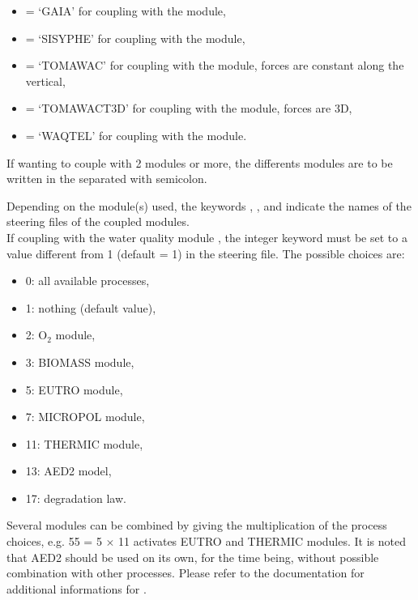 \begin{itemize}
\item  {}= `GAIA' for coupling with the \gaia module,

\item  {}= `SISYPHE' for coupling with the \sisyphe module,

\item  {}= `TOMAWAC' for coupling with the \tomawac module,
forces are constant along the vertical,

\item  {}= `TOMAWACT3D' for coupling with the \tomawac module,
forces are 3D,

\item  {}= `WAQTEL' for coupling with the \waqtel module.

\end{itemize}

If wanting to couple with 2 modules or more, the differents modules are to
be written in the  separated with semicolon.

Depending on the module(s) used, the keywords
, ,
 and 
indicate the names of the steering files
of the coupled modules.\\

If coupling with the water quality module \waqtel, the integer keyword
 must be set to a value different from 1 (default = 1)
in the  steering file.
The possible choices are:
\begin{itemize}
\item 0: all available processes,
\item 1: nothing (default value),
\item 2: O$_2$ module,
\item 3: BIOMASS module,
\item 5: EUTRO module,
\item 7: MICROPOL module,
\item 11: THERMIC module,
\item 13: AED2 model,
\item 17: degradation law.
\end{itemize}

Several modules can be combined by giving the multiplication of the process choices,
e.g. 55 = 5 $\times$ 11 activates EUTRO and THERMIC modules.
It is noted that AED2 should be used on its own, for the time being,
without possible combination with other processes.
Please refer to the \waqtel documentation for additional informations for
\waqtel.\\

